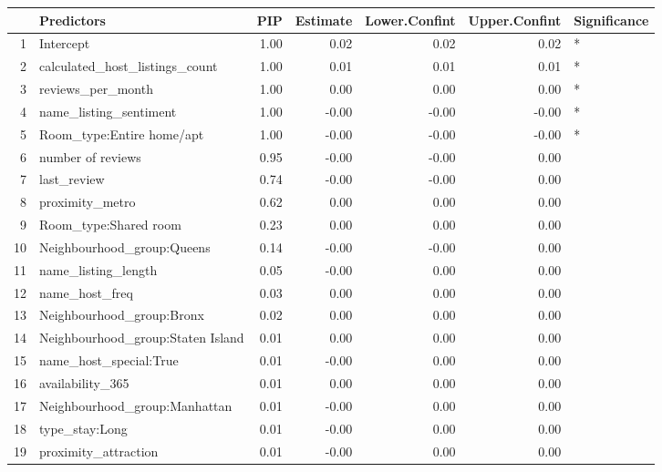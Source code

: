 \begin{table}[ht]
\centering
\begin{tabular}{rlrrrrl}
  \hline
 & Predictors & PIP & Estimate & Lower.Confint & Upper.Confint & Significance \\ 
  \hline
1 & Intercept & 1.00 & 0.02 & 0.02 & 0.02 & * \\ 
  2 & calculated\_host\_listings\_count & 1.00 & 0.01 & 0.01 & 0.01 & * \\ 
  3 & reviews\_per\_month & 1.00 & 0.00 & 0.00 & 0.00 & * \\ 
  4 & name\_listing\_sentiment & 1.00 & -0.00 & -0.00 & -0.00 & * \\ 
  5 & Room\_type:Entire home/apt & 1.00 & -0.00 & -0.00 & -0.00 & * \\ 
  6 & number of reviews & 0.95 & -0.00 & -0.00 & 0.00 &  \\ 
  7 & last\_review & 0.74 & -0.00 & -0.00 & 0.00 &  \\ 
  8 & proximity\_metro & 0.62 & 0.00 & 0.00 & 0.00 &  \\ 
  9 & Room\_type:Shared room & 0.23 & 0.00 & 0.00 & 0.00 &  \\ 
  10 & Neighbourhood\_group:Queens & 0.14 & -0.00 & -0.00 & 0.00 &  \\ 
  11 & name\_listing\_length & 0.05 & -0.00 & 0.00 & 0.00 &  \\ 
  12 & name\_host\_freq & 0.03 & 0.00 & 0.00 & 0.00 &  \\ 
  13 & Neighbourhood\_group:Bronx & 0.02 & 0.00 & 0.00 & 0.00 &  \\ 
  14 & Neighbourhood\_group:Staten Island & 0.01 & 0.00 & 0.00 & 0.00 &  \\ 
  15 & name\_host\_special:True & 0.01 & -0.00 & 0.00 & 0.00 &  \\ 
  16 & availability\_365 & 0.01 & 0.00 & 0.00 & 0.00 &  \\ 
  17 & Neighbourhood\_group:Manhattan & 0.01 & -0.00 & 0.00 & 0.00 &  \\ 
  18 & type\_stay:Long & 0.01 & -0.00 & 0.00 & 0.00 &  \\ 
  19 & proximity\_attraction & 0.01 & -0.00 & 0.00 & 0.00 &  \\ 
   \hline
\end{tabular}
\end{table}
